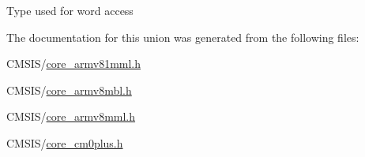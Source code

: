 Type used for word access 

The documentation for this union was generated from the following files\+:\begin{DoxyCompactItemize}
\item 
C\+M\+S\+I\+S/\mbox{\hyperlink{core__armv81mml_8h}{core\+\_\+armv81mml.\+h}}\item 
C\+M\+S\+I\+S/\mbox{\hyperlink{core__armv8mbl_8h}{core\+\_\+armv8mbl.\+h}}\item 
C\+M\+S\+I\+S/\mbox{\hyperlink{core__armv8mml_8h}{core\+\_\+armv8mml.\+h}}\item 
C\+M\+S\+I\+S/\mbox{\hyperlink{core__cm0plus_8h}{core\+\_\+cm0plus.\+h}}\end{DoxyCompactItemize}
